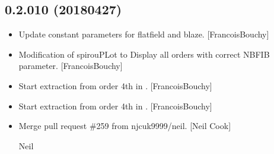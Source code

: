 \documentclass[a4paper,10pt,english]{report}
\begin{document}
\subsection{0.2.010 (2018\sphinxhyphen{}04\sphinxhyphen{}27)}
\label{\detokenize{misc/changelog:id469}}\begin{itemize}
\item {} 
Update constant parameters for flat\sphinxhyphen{}field and blaze. {[}FrancoisBouchy{]}

\item {} 
Modification of spirouPLot to Display all orders with correct NBFIB
parameter. {[}FrancoisBouchy{]}

\item {} 
Start extraction from order 4th in .
{[}FrancoisBouchy{]}

\item {} 
Start extraction from order 4th in . {[}FrancoisBouchy{]}

\item {} 
Merge pull request \#259 from njcuk9999/neil. {[}Neil Cook{]}

Neil

\end{itemize}
\end{document}

